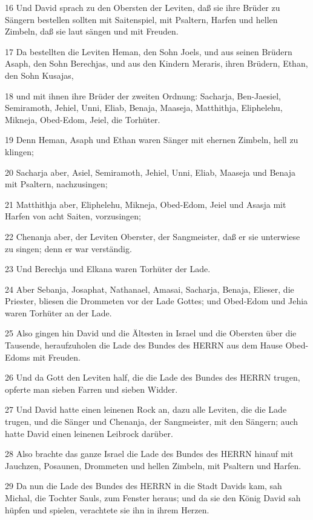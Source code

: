 \par 16 Und David sprach zu den Obersten der Leviten, daß sie ihre Brüder zu Sängern bestellen sollten mit Saitenspiel, mit Psaltern, Harfen und hellen Zimbeln, daß sie laut sängen und mit Freuden.
\par 17 Da bestellten die Leviten Heman, den Sohn Joels, und aus seinen Brüdern Asaph, den Sohn Berechjas, und aus den Kindern Meraris, ihren Brüdern, Ethan, den Sohn Kusajas,
\par 18 und mit ihnen ihre Brüder der zweiten Ordnung: Sacharja, Ben-Jaesiel, Semiramoth, Jehiel, Unni, Eliab, Benaja, Maaseja, Matthithja, Eliphelehu, Mikneja, Obed-Edom, Jeiel, die Torhüter.
\par 19 Denn Heman, Asaph und Ethan waren Sänger mit ehernen Zimbeln, hell zu klingen;
\par 20 Sacharja aber, Asiel, Semiramoth, Jehiel, Unni, Eliab, Maaseja und Benaja mit Psaltern, nachzusingen;
\par 21 Matthithja aber, Eliphelehu, Mikneja, Obed-Edom, Jeiel und Asasja mit Harfen von acht Saiten, vorzusingen;
\par 22 Chenanja aber, der Leviten Oberster, der Sangmeister, daß er sie unterwiese zu singen; denn er war verständig.
\par 23 Und Berechja und Elkana waren Torhüter der Lade.
\par 24 Aber Sebanja, Josaphat, Nathanael, Amasai, Sacharja, Benaja, Elieser, die Priester, bliesen die Drommeten vor der Lade Gottes; und Obed-Edom und Jehia waren Torhüter an der Lade.
\par 25 Also gingen hin David und die Ältesten in Israel und die Obersten über die Tausende, heraufzuholen die Lade des Bundes des HERRN aus dem Hause Obed-Edoms mit Freuden.
\par 26 Und da Gott den Leviten half, die die Lade des Bundes des HERRN trugen, opferte man sieben Farren und sieben Widder.
\par 27 Und David hatte einen leinenen Rock an, dazu alle Leviten, die die Lade trugen, und die Sänger und Chenanja, der Sangmeister, mit den Sängern; auch hatte David einen leinenen Leibrock darüber.
\par 28 Also brachte das ganze Israel die Lade des Bundes des HERRN hinauf mit Jauchzen, Posaunen, Drommeten und hellen Zimbeln, mit Psaltern und Harfen.
\par 29 Da nun die Lade des Bundes des HERRN in die Stadt Davids kam, sah Michal, die Tochter Sauls, zum Fenster heraus; und da sie den König David sah hüpfen und spielen, verachtete sie ihn in ihrem Herzen.

